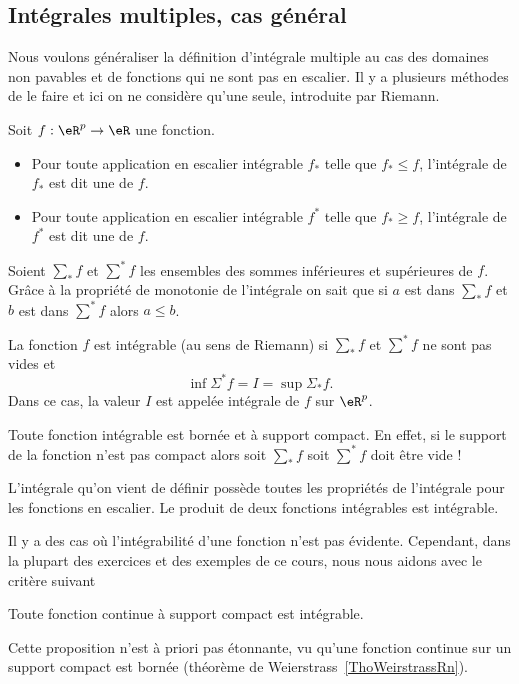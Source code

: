 \subsection{Intégrales multiples, cas général}

Nous voulons généraliser la définition d'intégrale multiple au cas des domaines non pavables et de fonctions qui ne sont pas en escalier. Il y a plusieurs méthodes de le faire et ici on ne considère qu'une seule, introduite par Riemann.
\begin{definition} Soit \( f: \eR^p\to \eR\) une fonction.
	\begin{itemize}
		\item Pour toute application en escalier intégrable \( f_*\) telle que \( f_*\leq f\), l'intégrale de \( f_*\) est dit une  de \( f\).
		\item Pour toute application en escalier intégrable \( f^*\) telle que \( f_*\geq f\), l'intégrale de \( f^*\) est dit une  de \( f\).
	\end{itemize}
\end{definition}
Soient \( \sum_* f\) et  \( \sum^* f\) les ensembles des sommes inférieures et supérieures de \( f\). Grâce à la propriété de  monotonie de l'intégrale on sait que si \( a\) est dans \( \sum_* f\) et  \( b\) est dans \( \sum^* f\) alors \( a\leq b\).
\begin{definition}
	La fonction \( f\) est intégrable (au sens de Riemann) si \( \sum_* f\) et  \( \sum^* f\) ne sont pas vides et
	\[
		\inf \Sigma^* f=I =\sup \Sigma_* f.
	\]
	Dans ce cas, la valeur \( I\) est appelée intégrale de \( f\) sur \( \eR^p\).
\end{definition}
\begin{remark}
	Toute fonction intégrable est bornée et à support compact. En effet, si le support de la  fonction n'est pas compact alors soit \( \sum_* f\) soit \( \sum^* f\) doit être vide !
\end{remark}
L'intégrale qu'on vient de définir possède toutes les propriétés de l'intégrale pour les fonctions en escalier. Le produit de deux fonctions intégrables est intégrable.

Il y a des cas où l'intégrabilité d'une fonction n'est pas évidente. Cependant, dans la plupart des exercices et des exemples de ce cours, nous nous aidons avec le critère suivant
\begin{proposition}
	Toute fonction continue à support compact est intégrable.
\end{proposition}
Cette proposition n'est à priori pas étonnante, vu qu'une fonction continue sur un support compact est bornée (théorème de Weierstrass~\ref{ThoWeirstrassRn}).

